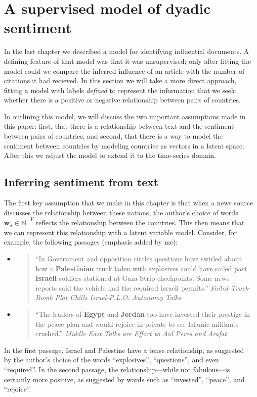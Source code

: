 \section{A supervised model of dyadic sentiment}

\label{section:foreign_relations_supervised_model}

In the last chapter we described a model for identifying influential
documents.  A defining feature of that model was that it was
unsupervised; only after fitting the model could we compare the
inferred influence of an article with the number of citations it had
recieved.  In this section we will take a more direct approach,
fitting a model with labels \emph{defined} to represent the
information that we seek: whether there is a positive or negative
relationship between pairs of countries.

In outlining this model, we will discuss the two important assumptions
made in this paper: first, that there is a relationship between text
and the sentiment between pairs of countries; and second, that there
is a way to model the sentiment between countries by modeling
countries as vectors in a latent space.  After this we adjust the
model to extend it to the time-series domain.

\subsection{Inferring sentiment from text}
\label{section:text_regression}
The first key assumption that we make in this chapter is that when a
news source discusses the relationship between these nations, the
author's choice of words $\bm w_d \in \mathbb{N^+}^V$ reflects the
relationship between the countries.  This then means that we can
represent this relationship with a latent variable model.  Consider,
for example, the following passages (emphasis added by me):
\begin{itemize}
\item \begin{quote} ``In Government and opposition circles
      questions have swirled about how a \textbf{Palestinian} truck laden with
      explosives could have sailed past \textbf{Israeli} soldiers stationed at
      Gaza Strip checkpoints.  Some news reports said the vehicle had
      the required Israeli permits.'' \emph{Failed Truck-Bomb Plot Chills
      Israel-P.L.O. Autonomy Talks} \citep{nyt_haberman:1995}
  \end{quote}
\item \begin{quote} ``The leaders of \textbf{Egypt} and
    \textbf{Jordan} too have invested their prestige in the peace plan
    and would rejoice in private to see Islamic militants crushed.''
    \emph{Middle East Talks are Effort to Aid Peres and Arafat}
    \citep{nyt_jehl:1996}
    \end{quote}
\end{itemize}
In the first passage, Israel and Palestine have a tense relationship,
as suggested by the author's choice of the words ``explosives'',
``questions'', and even ``required''.  In the second passage, the
relationship---while not fabulous---is certainly more
positive, as suggested by words such as ``invested'', ``peace'', and
``rejoice''.

